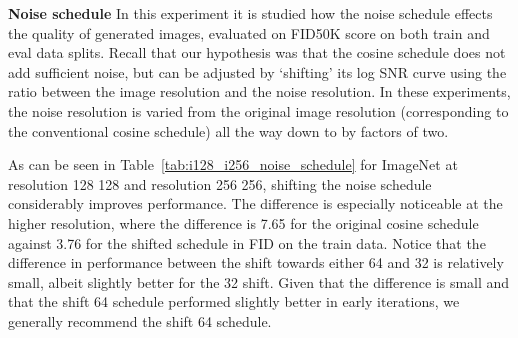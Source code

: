 \documentclass[nohyperref]{article}
\theoremstyle{plain}
\theoremstyle{definition}
\theoremstyle{remark}
\begin{document}
\begin{table}
    \centering
    \caption{Noise Schedule on ImageNet 128 and 256.}\vspace{-.2cm}
    \label{tab:i128_i256_noise_schedule}
    \vspace{-.2cm}
\end{table}

\textbf{Noise schedule}
In this experiment it is studied how the noise schedule effects the quality of generated images, evaluated on FID50K score on both train and eval data splits. Recall that our hypothesis was that the cosine schedule does not add sufficient noise, but can be adjusted by `shifting' its log SNR curve using the ratio between the image resolution and the noise resolution. In these experiments, the noise resolution is varied from the original image resolution (corresponding to the conventional cosine schedule) all the way down to  by factors of two.

As can be seen in Table~\ref{tab:i128_i256_noise_schedule} for ImageNet at resolution 128  128 and resolution 256  256, shifting the noise schedule considerably improves performance. The difference is especially noticeable at the higher resolution, where the difference is 7.65 for the original cosine schedule against 3.76 for the shifted schedule in FID on the train data. Notice that the difference in performance between the shift towards either 64 and 32 is relatively small, albeit slightly better for the 32 shift. Given that the difference is small and that the shift 64 schedule performed slightly better in early iterations, we generally recommend the shift 64 schedule.
\end{document}
